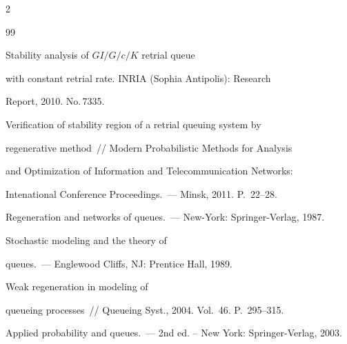 \begin{multicols}{2}
{{


\begin{thebibliography}{99}







  Stability  analysis of $GI/G/c/K$ retrial queue


with constant retrial rate. \mbox{INRIA} (Sophia Antipolis): Research


Report,  2010. No.\,7335.









Verification of stability region of a retrial queuing system by


    regenerative method~// Modern Probabilistic Methods for Analysis 


    and Optimization of Information and Telecommunication Networks: 


    Intenational Conference Proceedings.~--- Minsk, 2011. P.~22--28.





   




 Regeneration and networks of queues.~--- New-York: Springer-Verlag,  1987.







 Stochastic modeling and the theory of


    queues.~--- Englewood Cliffs, NJ: Prentice Hall, 1989.


    




 Weak regeneration in modeling of


    queueing processes~// Queueing Syst., 2004. Vol.~46.   P.~295--315.







 Applied probability and queues.~--- 2nd ed. -- New York: Springer-Verlag, 2003.






\end{thebibliography}}}
\end{multicols}
